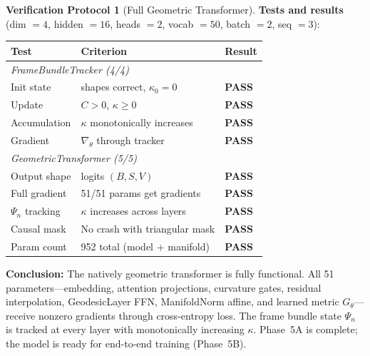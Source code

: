 \documentclass[11pt,a4paper]{article}
\theoremstyle{definition}
\newtheorem{protocol}[theorem]{Verification Protocol}
\theoremstyle{remark}
\begin{document}
\begin{protocol}[Full Geometric Transformer]
\textbf{Tests and results} (dim $= 4$, hidden $= 16$, heads $= 2$, 
vocab $= 50$, batch $= 2$, seq $= 3$):
\begin{center}
\begin{tabular}{lll}
\toprule
Test & Criterion & Result \\
\midrule
\multicolumn{3}{l}{\emph{FrameBundleTracker (4/4)}} \\
Init state & shapes correct, $\kappa_0 = 0$ & \textbf{PASS} \\
Update & $C > 0$, $\kappa \geq 0$ & \textbf{PASS} \\
Accumulation & $\kappa$ monotonically increases & \textbf{PASS} \\
Gradient & $\nabla_\theta$ through tracker & \textbf{PASS} \\
\midrule
\multicolumn{3}{l}{\emph{GeometricTransformer (5/5)}} \\
Output shape & logits $(B,S,V)$ & \textbf{PASS} \\
Full gradient & 51/51 params get gradients & \textbf{PASS} \\
$\Psi_n$ tracking & $\kappa$ increases across layers & \textbf{PASS} \\
Causal mask & No crash with triangular mask & \textbf{PASS} \\
Param count & 952 total (model + manifold) & \textbf{PASS} \\
\bottomrule
\end{tabular}
\end{center}
\textbf{Conclusion:} The natively geometric transformer is fully 
functional. All 51 parameters---embedding, attention projections, 
curvature gates, residual interpolation, GeodesicLayer FFN, 
ManifoldNorm affine, and learned metric $G_\theta$---receive 
nonzero gradients through cross-entropy loss. The frame bundle 
state $\Psi_n$ is tracked at every layer with monotonically 
increasing $\kappa$. Phase~5A is complete; the model is ready 
for end-to-end training (Phase~5B).
\end{protocol}
\end{document}

